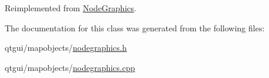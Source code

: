 Reimplemented from \mbox{\hyperlink{class_node_graphics_a6befa2f5ffc0c7efb4e56bc0c0aeff96}{Node\+Graphics}}.



The documentation for this class was generated from the following files\+:\begin{DoxyCompactItemize}
\item 
qtgui/mapobjects/\mbox{\hyperlink{nodegraphics_8h}{nodegraphics.\+h}}\item 
qtgui/mapobjects/\mbox{\hyperlink{nodegraphics_8cpp}{nodegraphics.\+cpp}}\end{DoxyCompactItemize}
